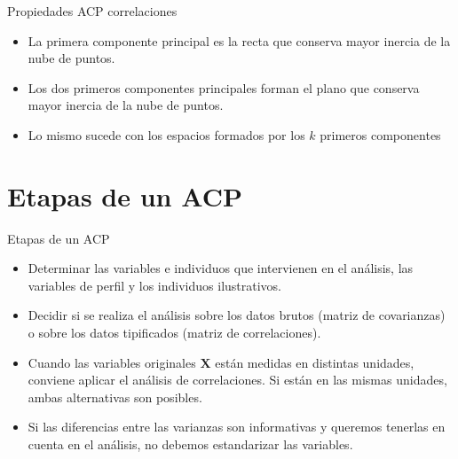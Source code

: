 \documentclass[
  ignorenonframetext,
]{beamer}
\begin{document}
\begin{frame}{Propiedades ACP correlaciones}
\label{propiedades-acp-correlaciones-1}
\begin{itemize}
\item
  La primera componente principal es la recta que conserva mayor inercia
  de la nube de puntos.
\item
  Los dos primeros componentes principales forman el plano que conserva
  mayor inercia de la nube de puntos.
\item
  Lo mismo sucede con los espacios formados por los \(k\) primeros
  componentes
\end{itemize}
\end{frame}

\section{Etapas de un ACP}\label{etapas-de-un-acp}

\begin{frame}{Etapas de un ACP}
\label{etapas-de-un-acp-1}
\begin{itemize}
\item
  Determinar las variables e individuos que intervienen en el análisis,
  las variables de perfil y los individuos ilustrativos.
\item
  Decidir si se realiza el análisis sobre los datos brutos (matriz de
  covarianzas) o sobre los datos tipificados (matriz de correlaciones).
\item
  Cuando las variables originales \(\mathbf{X}\) están medidas en
  distintas unidades, conviene aplicar el análisis de correlaciones. Si
  están en las mismas unidades, ambas alternativas son posibles.
\item
  Si las diferencias entre las varianzas son informativas y queremos
  tenerlas en cuenta en el análisis, no debemos estandarizar las
  variables.
\end{itemize}
\end{frame}
\end{document}
